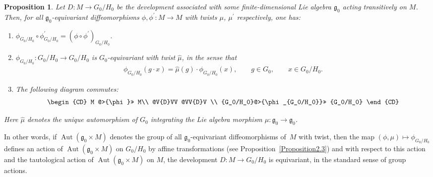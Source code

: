 \documentclass[pdftex]{sigma}
\DeclareMathOperator{\automorphism}{Aut}
\numberwithin{equation}{section}
\newtheorem{PropositionBlaom}[TheoremBlaom]{Proposition}
 { \theoremstyle{definition}
\newtheorem{CounterexampleBlaom}[TheoremBlaom]{Counterexample}
\newtheorem{RemarkBlaom}[TheoremBlaom]{Remark} }
\begin{document}
\begin{PropositionBlaom}\label{Proposition4.7} Let $D \colon M \rightarrow {G_0/H_0}$ be the
  development associated with some finite-di\-men\-sio\-nal Lie algebra
  ${\mathfrak g}_0$ acting transitively on $M$. Then, for all
  ${\mathfrak g}_0$-equivariant diffeomorphisms $\phi,\phi^\prime
  \colon M \rightarrow M$ with twists $\mu$, $\mu^\prime$ respectively,
  one has:
  \begin{enumerate}\itemsep=0pt
  \item[$(1)$] %
  $\phi_{G_0/H_0} \circ \phi^\prime_{G_0/H_0}=(\phi \circ
    \phi^\prime)_{G_0/H_0}$.

  \item[$(2)$] %
  $\phi_{G_0/H_0} \colon {G_0/H_0} \rightarrow
    {G_0/H_0} $ is $G_0$-equivariant with twist $\hat\mu$, in the
    sense that
  \begin{gather*}
    \phi_{G_0/H_0}(g\cdot x)=\hat\mu(g)\cdot \phi_{G_0/H_0}(x), \qquad g
    \in G_0,\qquad x \in {G_0/H_0}.
  \end{gather*}

  \item[$(3)$] %
  The following diagram commutes:
    \begin{gather*}
      \begin{CD}
          M   @>{\phi}>> M\\
          @V{D}VV @VV{D}V \\
          {G_0/H_0}@>{\phi_{G_0/H_0}}>> {G_0/H_0}
        \end{CD}
    \end{gather*}
  \end{enumerate}
   Here $\hat \mu$ denotes the unique automorphism of $G_0$
   integrating the Lie algebra morphism $\mu \colon {\mathfrak g}_0
   \rightarrow {\mathfrak g}_0$.
 \end{PropositionBlaom}

 In other words, if $\automorphism({\mathfrak g}_0 \times M)$ denotes
 the group of all ${\mathfrak g}_0$-equivariant dif\/feomorphisms of~$M$
 with twist, then the map $(\phi,\mu) \mapsto \phi_{G_0/H_0}$ def\/ines
 an action of $\automorphism({\mathfrak g}_0 \times M)$ on ${G_0/H_0}$
 by af\/f\/ine transformations (see Proposition~\ref{Proposition2.3}) %
 and with
 respect to this action and the tautological action of
 $\automorphism({\mathfrak g}_0 \times M)$ on $M$, the development $D
 \colon M \rightarrow {G_0/H_0}$ is equivariant, in the standard sense
 of group actions.
\end{document}
